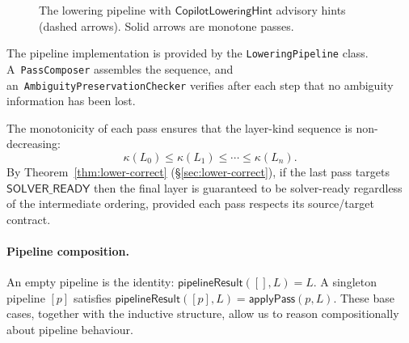 \documentclass[11pt]{article}
\newcommand{\CLH}{\mathsf{CopilotLoweringHint}}
\newcommand{\Surface}{\mathsf{SURFACE}}
\newcommand{\Semantic}{\mathsf{SEMANTIC}}
\newcommand{\Logical}{\mathsf{LOGICAL}}
\newcommand{\SolverReady}{\mathsf{SOLVER\_READY}}
\begin{document}
\begin{figure}[t]
\centering
{}
\caption{The lowering pipeline with $\CLH$ advisory hints
  (dashed arrows).  Solid arrows are monotone passes.}
\label{fig:pipeline}
\end{figure}

The pipeline implementation is provided by the
\texttt{LoweringPipeline} class.  A~\texttt{PassComposer} assembles
the sequence, and an~\texttt{AmbiguityPreservationChecker} verifies
after each step that no ambiguity information has been lost.

The monotonicity of each pass ensures that the layer-kind sequence is
non-decreasing:
\[
  \kappa(L_0) \le \kappa(L_1) \le \cdots \le \kappa(L_n).
\]
By Theorem~\ref{thm:lower-correct} (\S\ref{sec:lower-correct}),
if the last pass targets $\SolverReady$ then the final layer is
guaranteed to be solver-ready regardless of the intermediate ordering,
provided each pass respects its source/target contract.

\paragraph{Pipeline composition.}
An empty pipeline is the identity: $\mathsf{pipelineResult}([], L) = L$.
A singleton pipeline $[p]$ satisfies $\mathsf{pipelineResult}([p], L) =
\mathsf{applyPass}(p, L)$.  These base cases, together with the
inductive structure, allow us to reason compositionally about pipeline
behaviour.
\end{document}
